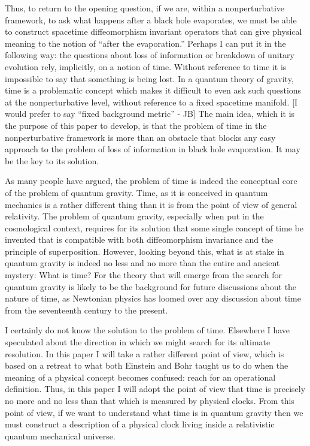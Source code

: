 \documentclass{article}
\begin{document}
Thus, to return to the opening question, if we are, within a
nonperturbative framework, to ask what happens after a black hole
evaporates, we must be able to construct spacetime diffeomorphism
invariant operators that can give physical meaning to the notion of
``after the evaporation.'' Perhaps I can put it in the following way:
the questions about loss of information or breakdown of unitary
evolution rely, implicitly, on a notion of time. Without reference to
time it is impossible to say that something is being lost. In a quantum
theory of gravity, time is a problematic concept which makes it
difficult to even ask such questions at the nonperturbative level,
without reference to a fixed spacetime manifold. {[}I would prefer to
say ``fixed background metric'' - JB{]} The main idea, which it is the
purpose of this paper to develop, is that the problem of time in the
nonperturbative framework is more than an obstacle that blocks any easy
approach to the problem of loss of information in black hole
evaporation. It may be the key to its solution.

As many people have argued, the problem of time is indeed the conceptual
core of the problem of quantum gravity. Time, as it is conceived in
quantum mechanics is a rather different thing than it is from the point
of view of general relativity. The problem of quantum gravity,
especially when put in the cosmological context, requires for its
solution that some single concept of time be invented that is compatible
with both diffeomorphism invariance and the principle of superposition.
However, looking beyond this, what is at stake in quantum gravity is
indeed no less and no more than the entire and ancient mystery: What is
time? For the theory that will emerge from the search for quantum
gravity is likely to be the background for future discussions about the
nature of time, as Newtonian physics has loomed over any discussion
about time from the seventeenth century to the present.

I certainly do not know the solution to the problem of time. Elsewhere I
have speculated about the direction in which we might search for its
ultimate resolution. In this paper I will take a rather different point
of view, which is based on a retreat to what both Einstein and Bohr
taught us to do when the meaning of a physical concept becomes confused:
reach for an operational definition. Thus, in this paper I will adopt
the point of view that time is precisely no more and no less than that
which is measured by physical clocks. From this point of view, if we
want to understand what time is in quantum gravity then we must
construct a description of a physical clock living inside a relativistic
quantum mechanical universe.
\end{document}

